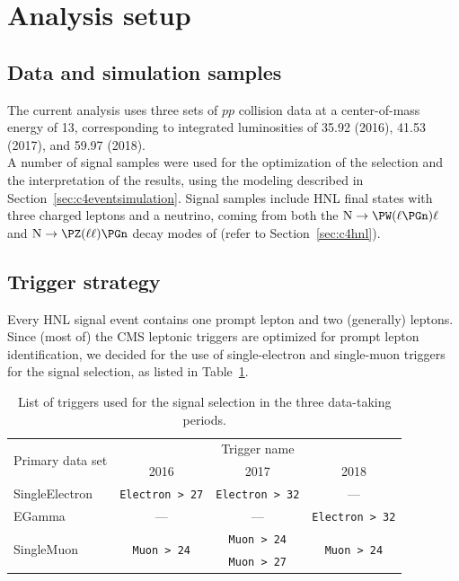 \section{Analysis setup}
\subsection{Data and simulation samples}
The current analysis uses three sets of $pp$ collision data at a
center-of-mass energy of 13\TeV, corresponding to integrated
luminosities of 35.92 \fbinv (2016), 41.53 \fbinv (2017), and 59.97 \fbinv
(2018). \\
A number of signal samples were used for the optimization of the
selection and the interpretation of the results, using the modeling
described in Section~\ref{sec:c4eventsimulation}.
Signal samples include HNL final states with three charged leptons and a
neutrino, coming from both the
$\hnl\to\PW(\ell\PGn)\ell$ and $\hnl\to\PZ(\ell\ell)\PGn$ decay modes
of \hnl (refer to Section~\ref{sec:c4hnl}).

\subsection{Trigger strategy}\label{sec:trigger}
Every HNL signal event contains one prompt lepton and two (generally)
\displ leptons. Since (most of) the CMS leptonic triggers are
optimized for prompt lepton identification,
we decided for the use of single-electron and single-muon triggers for the
signal selection, as listed in Table~\ref{tab:sgnlTriggers}.
\begin{table}[h]
{\small
  \begin{center}
    \caption{\label{tab:sgnlTriggers} List of triggers used for the
      signal selection in the three data-taking periods.}
      \begin{tabular}{|l|c|c|c|}
      \hline
      \multirow{2}{*}{Primary data set} & \multicolumn{3}{c|}{Trigger name}\\
      \cline{2-4}
      & 2016 & 2017 & 2018 \\
      \hline\hline
      SingleElectron & \texttt{\scriptsize Electron > 27} & \texttt{\scriptsize Electron > 32} & --- \\
      \hline
      EGamma         & --- & --- & \texttt{\scriptsize Electron > 32} \\
      \hline
      \multirow{2}{*}{SingleMuon} & \multirow{2}{*}{\texttt{\scriptsize Muon > 24}} & \texttt{\scriptsize Muon > 24} & \multirow{2}{*}{\texttt{\scriptsize Muon > 24}} \\
      & & \texttt{\scriptsize Muon > 27} & \\
      \hline
    \end{tabular}    
  \end{center}}
\end{table}

